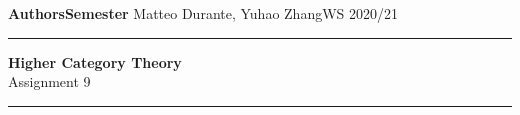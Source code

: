 \documentclass[a4paper,11pt,openany]{scrartcl}
\begin{document}
\noindent\textbf{Authors}\hfill\textbf{Semester} \linebreak
\vspace*{-.1cm} Matteo Durante, Yuhao Zhang\hfill WS 2020/21 \\

\noindent
\rule{\linewidth}{1pt}
\begin{center}
\Large
\textbf{Higher Category Theory} \\
Assignment 9
\end{center}
\rule{\linewidth}{1pt}
\\


\newcommand{\La}{\Lambda}
\newcommand{\pa}{\partial}
\newcommand{\ob}{\operatorname{Ob}}
\newcommand{\mor}{\operatorname{Mor}}
\newcommand{\sto}{\twoheadrightarrow}

\newcommand{\plim}{\varprojlim}
\newcommand{\sst}{\subseteq}
\newcommand{\eq}{\operatorname{eq}}

\newcommand{\f}{\varphi}

\newcommand{\sing}{\operatorname{Sing}}
\end{document}
